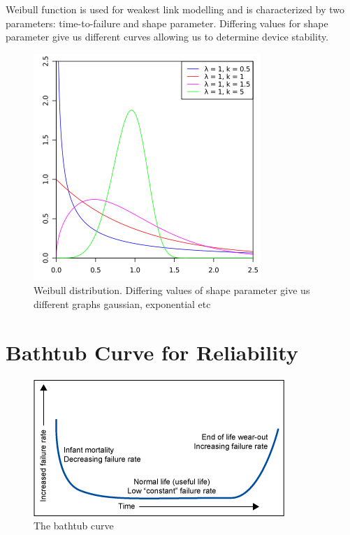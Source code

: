 \noindent Weibull function is used for weakest link modelling and is characterized by two parameters: time-to-failure and shape parameter. Differing values for shape parameter give us different curves allowing us to determine device stability.

\begin{figure}[H]
\centering
\includegraphics[scale=0.6]{./fig29} %
\caption{Weibull distribution. Differing values of shape parameter give us different graphs gaussian, exponential etc}
\label{3.28} %
\end{figure}




\section{Bathtub Curve for Reliability }

\begin{figure}[htb]
\centering
\includegraphics[scale=0.6]{./fig30} %
\caption{The bathtub curve}
\label{3.30} %
\end{figure}


